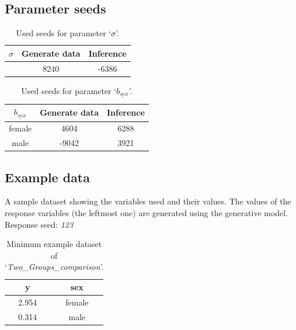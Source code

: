 \documentclass[11pt]{scrartcl}\usepackage[]{graphicx}\usepackage[table]{xcolor}
\begin{document}
\subsection{Parameter seeds} 
\begin{table} [!htbp] 
 \begin{center} 
  \begin{tabular}{||c c c||} 
 \hline $\sigma$ & Generate data & Inference \\ \hline 
   & 8240 & -6386 \\ 
  \hline 
  \end{tabular} 
 \end{center} 
 \caption{Used seeds for parameter `$\sigma$'.} 
\end{table} 
\begin{table} [!htbp] 
 \begin{center} 
  \begin{tabular}{||c c c||} 
 \hline $\underline{b_{sex}}$ & Generate data & Inference \\ \hline 
  female & 4604 & 6288 \\ 
  male & -9042 & 3921 \\ 
  \hline 
  \end{tabular} 
 \end{center} 
 \caption{Used seeds for parameter `$\underline{b_{sex}}$'.} 
\end{table} 
\subsection{Example data} 
A sample dataset showing the variables used and their values. The values of the response variables (the leftmost one) are generated using the generative model. \\ 
Response seed: \textit{123}\\
\begin{table}[htbp] 
 \begin{center} 
  \begin{tabular}{||c c||}
  \hline 
  y & sex\\ 
  \hline \hline 
  2.954 & female\\ 
  \hline 
  0.314 & male\\ 
  \hline 
  \end{tabular} 
 \end{center}
 \caption{Minimum example dataset of `\textit{Two\_Groups\_comparison}'.}
 \label{id-4_model-Two_Groups_comparison_minDatasetWOUnusedOV}
\end{table}
\end{document}
